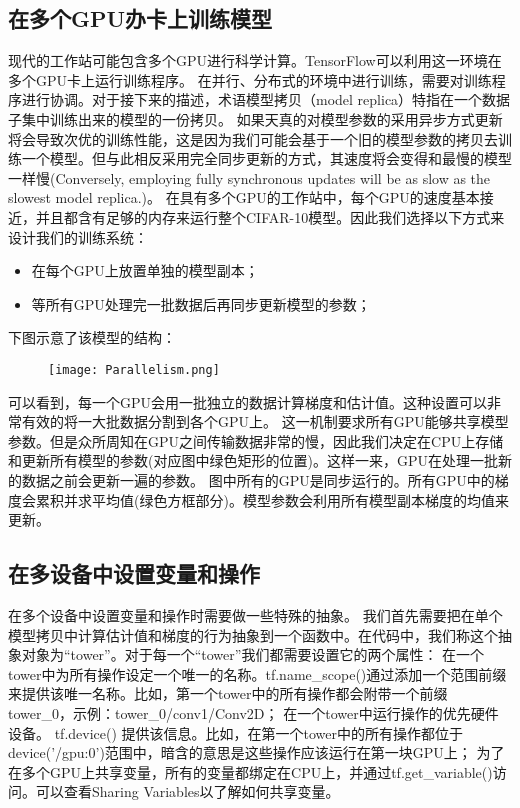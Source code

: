 {\subsection{在多个GPU办卡上训练模型}
现代的工作站可能包含多个GPU进行科学计算。TensorFlow可以利用这一环境在多个GPU卡上运行训练程序。
在并行、分布式的环境中进行训练，需要对训练程序进行协调。对于接下来的描述，术语模型拷贝（model replica）特指在一个数据子集中训练出来的模型的一份拷贝。
如果天真的对模型参数的采用异步方式更新将会导致次优的训练性能，这是因为我们可能会基于一个旧的模型参数的拷贝去训练一个模型。但与此相反采用完全同步更新的方式，其速度将会变得和最慢的模型一样慢(Conversely, employing fully synchronous updates will be as slow as the slowest model replica.)。
在具有多个GPU的工作站中，每个GPU的速度基本接近，并且都含有足够的内存来运行整个CIFAR-10模型。因此我们选择以下方式来设计我们的训练系统：
\begin{itemize}
\item 在每个GPU上放置单独的模型副本；
\item 等所有GPU处理完一批数据后再同步更新模型的参数；
\end{itemize}
下图示意了该模型的结构：
\begin{figure}[H]
\centering
\texttt{[image: Parallelism.png]}
\end{figure}
可以看到，每一个GPU会用一批独立的数据计算梯度和估计值。这种设置可以非常有效的将一大批数据分割到各个GPU上。
这一机制要求所有GPU能够共享模型参数。但是众所周知在GPU之间传输数据非常的慢，因此我们决定在CPU上存储和更新所有模型的参数(对应图中绿色矩形的位置)。这样一来，GPU在处理一批新的数据之前会更新一遍的参数。
图中所有的GPU是同步运行的。所有GPU中的梯度会累积并求平均值(绿色方框部分)。模型参数会利用所有模型副本梯度的均值来更新。
\subsection{在多设备中设置变量和操作}
在多个设备中设置变量和操作时需要做一些特殊的抽象。
我们首先需要把在单个模型拷贝中计算估计值和梯度的行为抽象到一个函数中。在代码中，我们称这个抽象对象为“tower”。对于每一个“tower”我们都需要设置它的两个属性：
在一个tower中为所有操作设定一个唯一的名称。tf.name\_scope()通过添加一个范围前缀来提供该唯一名称。比如，第一个tower中的所有操作都会附带一个前缀tower\_0，示例：tower\_0/conv1/Conv2D；
在一个tower中运行操作的优先硬件设备。 tf.device() 提供该信息。比如，在第一个tower中的所有操作都位于 device('/gpu:0')范围中，暗含的意思是这些操作应该运行在第一块GPU上；
为了在多个GPU上共享变量，所有的变量都绑定在CPU上，并通过tf.get\_variable()访问。可以查看Sharing Variables以了解如何共享变量。
}
